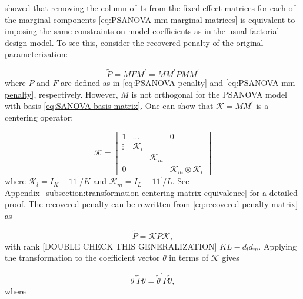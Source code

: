 \documentclass[12pt]{article}
\newcommand{\ms}{\scriptscriptstyle}
\theoremstyle{definition}
\begin{document}
\citet{lee2011p} showed that removing the column of $1$s from the fixed effect matrices for each of the marginal components \ref{eq:PSANOVA-mm-marginal-matrices} is equivalent to  imposing the same constraints on model coefficients as in the usual factorial design model. To see this, consider the recovered penalty of the original parameterization:

\begin{equation}\label{eq:recovered-penalty-matrix}
\tilde{P} = MFM^\prime = MM^\prime P M M^\prime
\end{equation}
where $P$ and $F$ are defined as in \ref{eq:PSANOVA-penalty} and \ref{eq:PSANOVA-mm-penalty}, respectively. However, $M$ is not orthogonal for the PSANOVA model with basis \ref{eq:SANOVA-basis-matrix}. One can show that $\mathscr{K} = M M^\prime$ is a centering operator:

\begin{equation} \label{eq:PSANOVA-centering-matrix}
\mathscr{K} = \begin{bmatrix}
1 	&    \dots	&	& 0 \\
 \vdots	&    \mathscr{K}_l	&	&\\
	& 	& \mathscr{K}_m	& \\
0 & & & \mathscr{K}_m \otimes \mathscr{K}_l
\end{bmatrix}
\end{equation}
\noindent 
where $\mathscr{K}_l = I_K - 11^\prime/K$ and $\mathscr{K}_m = I_L - 11^\prime/L$. See Appendix~\ref{subsection:transformation-centering-matrix-equivalence} for a detailed proof. The recovered penalty can be rewritten from \ref{eq:recovered-penalty-matrix} as

\begin{equation} \label{eq:recovered-PSANOVA-penalty}
\tilde{P} = \mathscr{K} P \mathscr{K},
\end{equation}
\noindent
with rank [DOUBLE CHECK THIS GENERALIZATION] $KL -  d_{\ms l} d_{\ms m}$. Applying the transformation to the coefficient vector $\theta$ in terms of $\mathscr{K}$ gives

\[
\theta^\prime \tilde{P} \theta = \tilde{\theta}^\prime P \tilde{\theta},
\]
where
\end{document}

